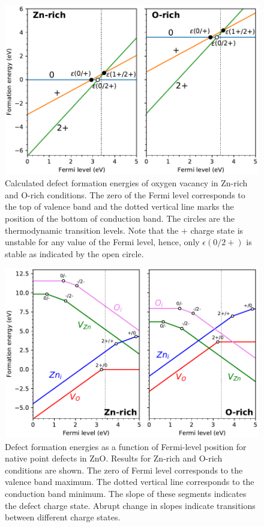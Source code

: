 \begin{figure}[tbph!]
	\centering
	\includegraphics[width=0.65\linewidth]{"images/rnd/O_vac-formation"}
	\caption[Calculated defect formation energies of oxygen vacancy in Zn-rich and O-rich conditions]{Calculated defect formation energies of oxygen vacancy in Zn-rich and O-rich conditions. The zero of the Fermi level corresponds to the top of valence band and the dotted vertical line marks the position of the bottom of conduction band. The circles are the thermodynamic transition levels. Note that the $+$ charge state is unstable for any value of the Fermi level, hence, only $\epsilon(0/2+)$ is stable as indicated by the open circle. }
	\label{fig:O_vac-form}
\end{figure}

\begin{figure}[tbh!]
	\centering
	\includegraphics[width=0.65\linewidth]{"images/rnd/defect-formation"}
	\caption[Defect formation energies as a function of Fermi-level position for native point defects in ZnO]{Defect formation energies as a function of Fermi-level position for native point defects in ZnO. Results for Zn-rich and O-rich conditions are shown. The zero of Fermi level corresponds to the valence band maximum. The dotted vertical line corresponds to the conduction band minimum. The slope of these segments indicates the defect charge state. Abrupt change in slopes indicate transitions between different charge states.}
	\label{fig:defect-formE}
\end{figure}

